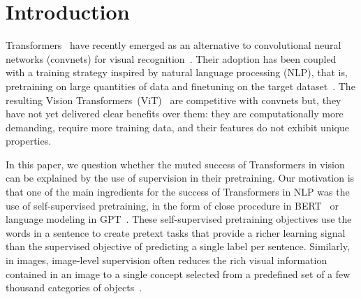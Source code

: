
\section{Introduction}
Transformers~\cite{vaswani2017attention} have recently emerged as an alternative to convolutional neural networks (convnets) for visual recognition~\cite{dosovitskiy2020image,touvron2020training,zhao2020exploring}.
Their adoption has been coupled with a training strategy inspired by natural language processing (NLP), that is, pretraining on large quantities of data and finetuning on the target dataset~\cite{devlin2018bert,radford2019language}. 
The resulting Vision Transformers~(ViT)~\cite{dosovitskiy2020image} are competitive with convnets but, they have not yet delivered clear benefits over them: %
they are computationally more demanding, require more training data, and their features do not exhibit unique properties. %

In this paper, we question whether the muted success of Transformers in vision can be explained by the use of supervision in their pretraining.
Our motivation is that one of the main ingredients for the success of Transformers in NLP was the use of self-supervised pretraining, in the form of close procedure in BERT~\cite{devlin2018bert} or language modeling in GPT~\cite{radford2019language}.
These self-supervised pretraining objectives use the words in a sentence to create pretext tasks that provide a richer learning signal than the supervised objective of predicting a single label per sentence.
Similarly, in images, image-level supervision often reduces the rich visual information contained in an image to a single concept selected from a predefined set of a few thousand categories of objects~\cite{russakovsky2015imagenet}.

